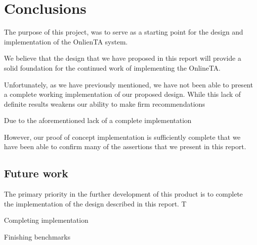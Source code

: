 \chapter{Conclusions}
The purpose of this project, was to serve as a starting point for the
design and implementation of the OnlienTA system.

We believe that the design that we have proposed in this report will
provide a solid foundation for the continued work of implementing the
OnlineTA.

Unfortunately, as we have previously mentioned, we have not been able
to present a complete working implementation of our proposed
design. While this lack of definite results weakens our ability to
make firm recommendations 




Due to the aforementioned lack of a complete implementation

However, our proof of concept implementation is sufficiently complete
that we have been able to confirm many of the assertions that we
present in this report.




\section{Future work}
The primary priority in the further development of this product is to
complete the implementation of the design described in this
report. T

Completing implementation

Finishing benchmarks



